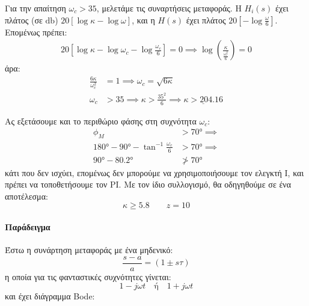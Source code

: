 \documentclass[11pt,a4paper,notitlepage,fleqn,final]{article}
\begin{document}
\begin{exercise}[Εφαρμογή]
Για την απαίτηση \( \omega_c > 35 \), μελετάμε τις συναρτήσεις μεταφοράς.
Η \( H_i(s) \) έχει πλάτος (σε \( \si{\decibel} \)) \( 20\left[\log κ - \log\omega\right] \),
και η \( H(s) \) έχει πλάτος \( 20\left[-\log\frac{\omega}{6}\right] \). Επομένως πρέπει:
\begin{align*}
	20\left[\log κ - \log \omega_c - \log\frac{\omega_c}{6}\right] = 0
	\implies \log\left( \frac{κ}{\frac{\omega_c^2}{6}} \right) = 0
\end{align*}
άρα:
\begin{align*}
	\frac{6κ}{\omega_c^2} &= 1 \implies \omega_c = \sqrt{6κ} \\
	\omega_c &>35 \implies κ > \frac{35^2}{6} \implies \underline{κ > 204.16}
\end{align*}

Ας εξετάσουμε και το περιθώριο φάσης στη συχνότητα \( \omega_c \):
\begin{align*}
	\phi_M &> \ang{70} \implies \\
	\ang{180} - \ang{90} - \tan^{-1}\frac{\omega_c}{6} &> \ang{70} \implies \\
	\ang{90} - \ang{80.2} &\ngtr \ang{70}
\end{align*}
κάτι που δεν ισχύει, επομένως δεν μπορούμε να χρησιμοποιήσουμε τον ελεγκτή I, και πρέπει
να τοποθετήσουμε τον PI. Με τον ίδιο συλλογισμό, θα οδηγηθούμε σε ένα αποτέλεσμα:
\[
κ \geq 5.8\qquad z=10
\]

\end{exercise}
\paragraph{Παράδειγμα}
Έστω η συνάρτηση μεταφοράς με ένα μηδενικό:
\[
\frac{s-a}{a} = (1\pm sτ)
\]
η οποία για τις φανταστικές συχνότητες γίνεται:
\[
1-j\omega t \quad \text{ή} \quad 1+j\omega t
\]
και έχει διάγραμμα Bode:
\end{document}
